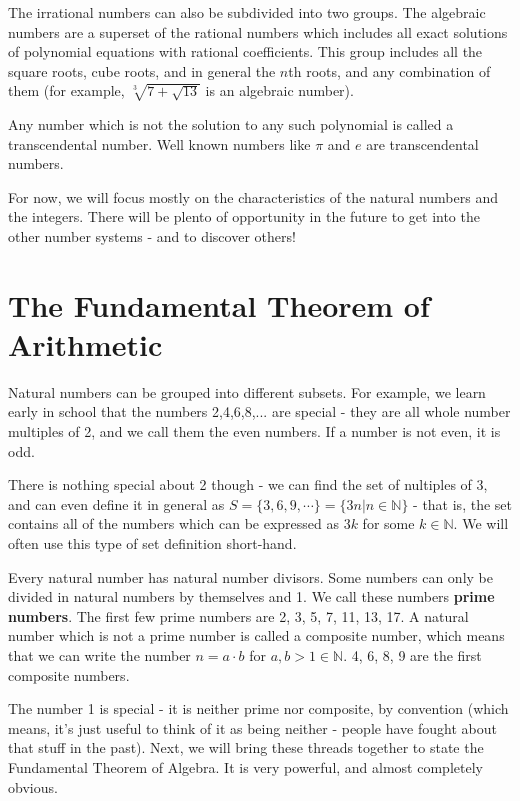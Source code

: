 \documentclass{article}
\begin{document}
The irrational numbers can also be subdivided into two groups. The algebraic
numbers are a superset of the rational numbers which includes all 
exact solutions of polynomial equations with rational coefficients. This group
includes all the square roots, cube roots, and in general the $n$th roots,
and any combination of them (for example, $\sqrt[3]{7+\sqrt{13}}$ is an
algebraic number).

Any number which is not the solution to any such polynomial is called a
transcendental number. Well known numbers like $\pi$ and $e$ are transcendental
numbers.

For now, we will focus mostly on the characteristics of the natural numbers and
the integers. There will be plento of opportunity in the future to get into the
other number systems - and to discover others!

\section{The Fundamental Theorem of Arithmetic}

Natural numbers can be grouped into different subsets. For example, we learn
early in school that the numbers 2,4,6,8,... are special - they are all whole
number multiples  of 2, and we call them the even numbers. If a number is not even,
it is odd.

There is nothing special about 2 though - we can find the set of nultiples of 3, and
can even define it in general as $S = \{3,6,9,\cdots\} = \{ 3n | n \in \mathbb{N}\}$
- that is, the set contains all of the numbers which can be expressed as $3k$ for some
$k\in \mathbb{N}$. We will often use this type of set definition short-hand.

Every natural number has natural number divisors. Some numbers can only be divided in
natural numbers by themselves and 1. We call these numbers \textbf{prime numbers}. The
first few prime numbers are 2, 3, 5, 7, 11, 13, 17. A natural number which is not a
prime number is called a composite number, which means that we can write the number
$n = a \cdot b$ for $a,b > 1 \in \mathbb{N}$. 4, 6, 8, 9 are the first composite numbers.

The number 1 is special - it is neither prime nor composite, by convention (which
means, it's just useful to think of it as being neither - people have fought about
that stuff in the past). Next, we will bring these threads together to state the
Fundamental Theorem of Algebra. It is very powerful, and almost completely obvious.
\end{document}
